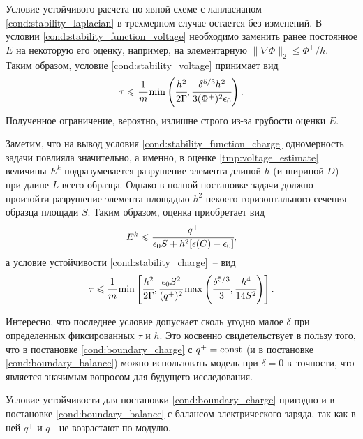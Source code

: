 Условие устойчивого расчета по явной схеме с лапласианом \eqref{cond:stability_laplacian} в трехмерном случае остается без изменений. В условии \eqref{cond:stability_function_voltage} необходимо заменить ранее постоянное $E$ на некоторую его оценку, например, на элементарную $\| \nabla \Phi \|_2 \leqslant \Phi^+ / h$. Таким образом, условие \eqref{cond:stability_voltage} принимает вид
\[
    \tau \leqslant \cfrac{1}{m} \min \left( \cfrac{h^2}{2 \Gamma}, \cfrac{\delta^{5/3} h^2}{3 (\Phi^+)^2 \epsilon_0} \right).
\]
Полученное ограничение, вероятно, излишне строго из-за грубости оценки $E$.

Заметим, что на вывод условия \eqref{cond:stability_function_charge} одномерность задачи повлияла значительно, а именно, в оценке \eqref{tmp:voltage_estimate} величины $E^k$ подразумевается разрушение элемента длиной $h$ (и шириной $D$) при длине $L$ всего образца. Однако в полной постановке задачи должно произойти разрушение элемента площадью $h^2$ некоего горизонтального сечения образца площади $S$. Таким образом, оценка приобретает вид
\[
    E^k \leqslant \cfrac{q^+}{\epsilon_0 S + h^2 [\epsilon(C) - \epsilon_0]},
\]
а условие устойчивости \eqref{cond:stability_charge}~-- вид
\[
    \tau \leqslant \cfrac{1}{m} \min \left[ \cfrac{h^2}{2 \Gamma}, \cfrac{\epsilon_0 S^2}{(q^+)^2} \max \left( \cfrac{\delta^{5/3}}{3}, \cfrac{h^4}{14 S^2} \right) \right].
\]

Интересно, что последнее условие допускает сколь угодно малое $\delta$ при определенных фиксированных $\tau$ и $h$. Это косвенно свидетельствует в пользу того, что в постановке \eqref{cond:boundary_charge} с $q^+ = \operatorname{{const}}$ (и в постановке \eqref{cond:boundary_balance}) можно использовать модель при $\delta = 0$ в~точности, что является значимым вопросом для будущего исследования.

Условие устойчивости для постановки \eqref{cond:boundary_charge} пригодно и в постановке \eqref{cond:boundary_balance} с балансом электрического заряда, так как в ней $q^+$ и $q^-$ не возрастают по модулю.